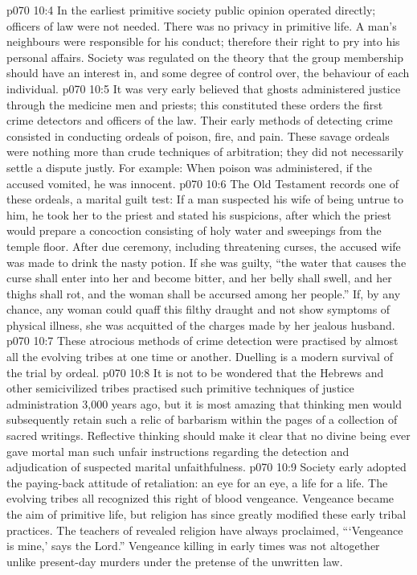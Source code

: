 \vs p070 10:4 \pc In the earliest primitive society public opinion operated directly; officers of law were not needed. There was no privacy in primitive life. A man’s neighbours were responsible for his conduct; therefore their right to pry into his personal affairs. Society was regulated on the theory that the group membership should have an interest in, and some degree of control over, the behaviour of each individual.
\vs p070 10:5 It was very early believed that ghosts administered justice through the medicine men and priests; this constituted these orders the first crime detectors and officers of the law. Their early methods of detecting crime consisted in conducting ordeals of poison, fire, and pain. These savage ordeals were nothing more than crude techniques of arbitration; they did not necessarily settle a dispute justly. For example: When poison was administered, if the accused vomited, he was innocent.
\vs p070 10:6 The Old Testament records one of these ordeals, a marital guilt test: If a man suspected his wife of being untrue to him, he took her to the priest and stated his suspicions, after which the priest would prepare a concoction consisting of holy water and sweepings from the temple floor. After due ceremony, including threatening curses, the accused wife was made to drink the nasty potion. If she was guilty, “the water that causes the curse shall enter into her and become bitter, and her belly shall swell, and her thighs shall rot, and the woman shall be accursed among her people.” If, by any chance, any woman could quaff this filthy draught and not show symptoms of physical illness, she was acquitted of the charges made by her jealous husband.
\vs p070 10:7 These atrocious methods of crime detection were practised by almost all the evolving tribes at one time or another. Duelling is a modern survival of the trial by ordeal.
\vs p070 10:8 It is not to be wondered that the Hebrews and other semicivilized tribes practised such primitive techniques of justice administration 3,000 years ago, but it is most amazing that thinking men would subsequently retain such a relic of barbarism within the pages of a collection of sacred writings. Reflective thinking should make it clear that no divine being ever gave mortal man such unfair instructions regarding the detection and adjudication of suspected marital unfaithfulness.
\vs p070 10:9 \pc Society early adopted the paying\hyp{}back attitude of retaliation: an eye for an eye, a life for a life. The evolving tribes all recognized this right of blood vengeance. Vengeance became the aim of primitive life, but religion has since greatly modified these early tribal practices. The teachers of revealed religion have always proclaimed, “‘Vengeance is mine,’ says the Lord.” Vengeance killing in early times was not altogether unlike present\hyp{}day murders under the pretense of the unwritten law.
